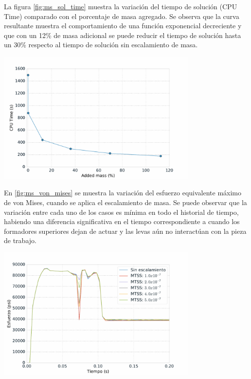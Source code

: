 La figura \ref{fig:ms_sol_time} muestra la variación del tiempo de solución (CPU Time) comparado con 
el porcentaje de masa agregado. Se observa que la curva resultante muestra el comportamiento de 
una función exponencial decreciente y que con un 12\% de masa adicional se puede reducir el tiempo 
de solución hasta un 30\% respecto al tiempo de solución sin escalamiento de masa.

\begin{center}
\includegraphics[width=0.75\textwidth]{src/ch4/ms_sol_time.pdf}
\label{fig:ms_sol_time}
\end{center}

En \ref{fig:ms_von_mises} se muestra la variación del esfuerzo equivalente máximo de von Mises, cuando 
se aplica el escalamiento de masa. Se puede observar que la variación entre cada uno de los casos 
es mínima en todo el historial de tiempo, habiendo una diferencia significativa en el tiempo 
correspondiente a cuando los formadores superiores dejan de actuar y las levas aún no interactúan 
con la pieza de trabajo.

\begin{center}
\includegraphics[width=0.75\textwidth]{src/ch4/ms_von_mises.pdf}
\label{fig:ms_von_mises}
\end{center}

